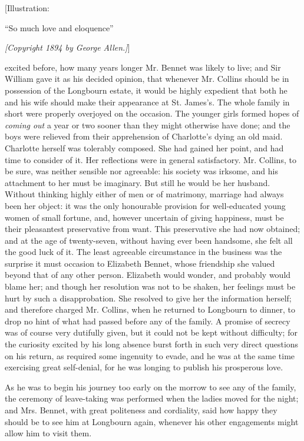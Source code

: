 \documentclass[12pt]{book}
\begin{document}
[Illustration:

``So much love and eloquence''

\emph{[\textit{Copyright 1894 by George Allen.}]}]

excited before, how many years longer Mr. Bennet was likely to live; and Sir William gave it as his decided opinion, that whenever Mr. Collins should be in possession of the Longbourn estate, it would be highly expedient that both he and his wife should make their appearance at St. James's. The whole family in short were properly overjoyed on the occasion. The younger girls formed hopes of \textit{coming out} a year or two sooner than they might otherwise have done; and the boys were relieved from their apprehension of Charlotte's dying an old maid. Charlotte herself was tolerably composed. She had gained her point, and had time to consider of it. Her reflections were in general satisfactory. Mr. Collins, to be sure, was neither sensible nor agreeable: his society was irksome, and his attachment to her must be imaginary. But still he would be her husband. Without thinking highly either of men or of matrimony, marriage had always been her object: it was the only honourable provision for well-educated young women of small fortune, and, however uncertain of giving happiness, must be their pleasantest preservative from want. This preservative she had now obtained; and at the age of twenty-seven, without having ever been handsome, she felt all the good luck of it. The least agreeable circumstance in the business was the surprise it must occasion to Elizabeth Bennet, whose friendship she valued beyond that of any other person. Elizabeth would wonder, and probably would blame her; and though her resolution was not to be shaken, her feelings must be hurt by such a disapprobation. She resolved to give her the information herself; and therefore charged Mr. Collins, when he returned to Longbourn to dinner, to drop no hint of what had passed before any of the family. A promise of secrecy was of course very dutifully given, but it could not be kept without difficulty; for the curiosity excited by his long absence burst forth in such very direct questions on his return, as required some ingenuity to evade, and he was at the same time exercising great self-denial, for he was longing to publish his prosperous love.

As he was to begin his journey too early on the morrow to see any of the family, the ceremony of leave-taking was performed when the ladies moved for the night; and Mrs. Bennet, with great politeness and cordiality, said how happy they should be to see him at Longbourn again, whenever his other engagements might allow him to visit them.
\end{document}
